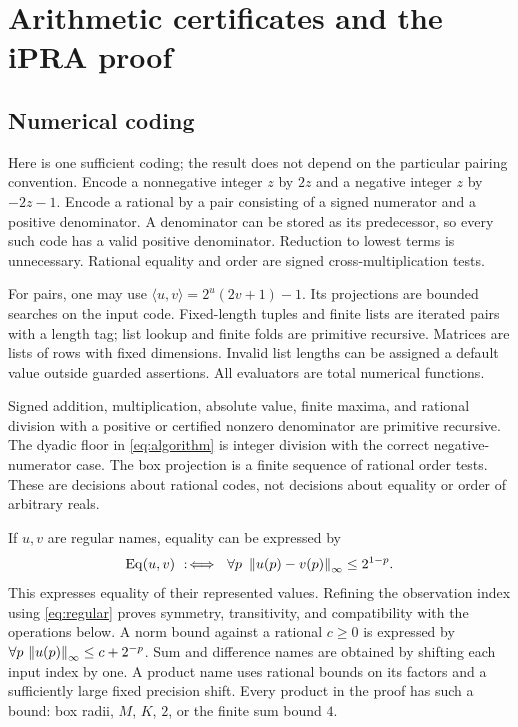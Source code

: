 \section{Arithmetic certificates and the iPRA proof}
\label{sec:arith}

\subsection{Numerical coding}

Here is one sufficient coding; the result does not depend on the
particular pairing convention. Encode a nonnegative integer \(z\)
by \(2z\) and a negative integer \(z\) by \(-2z-1\).
Encode a rational by a pair consisting of a signed numerator and
a positive denominator. A denominator can be stored as its
predecessor, so every such code has a valid positive denominator.
Reduction to lowest terms is unnecessary. Rational equality and
order are signed cross-multiplication tests.

For pairs, one may use
\(\langle u,v\rangle=2^u(2v+1)-1\). Its projections are bounded
searches on the input code. Fixed-length tuples and finite lists
are iterated pairs with a length tag; list lookup and finite
folds are primitive recursive. Matrices are lists of rows with
fixed dimensions. Invalid list lengths can be assigned a default
value outside guarded assertions. All evaluators are total
numerical functions.

Signed addition, multiplication, absolute value, finite maxima,
and rational division with a positive or certified nonzero
denominator are primitive recursive. The dyadic floor in
\eqref{eq:algorithm} is integer division with the correct
negative-numerator case. The box projection is a finite sequence
of rational order tests. These are decisions about rational
codes, not decisions about equality or order of arbitrary reals.

If \(u,v\) are regular names, equality can be expressed by
\[
 \operatorname{Eq}(u,v)\ :\!\iff\
 \forall p\ \left\lVert u(p)-v(p)\right\rVert_\infty\le2^{1-p}.
\]
This expresses equality of their represented values. Refining
the observation index using \eqref{eq:regular} proves symmetry,
transitivity, and compatibility with the operations below.
A norm bound against a rational \(c\ge0\) is expressed by
\(\forall p\,\left\lVert u(p)\right\rVert_\infty\le c+2^{-p}\).
Sum and difference names are obtained by shifting each input
index by one. A product name uses rational bounds on its
factors and a sufficiently large fixed precision shift.
Every product in the proof has such a bound: box radii, \(M\),
\(K\), \(2\), or the finite sum bound \(4\).

